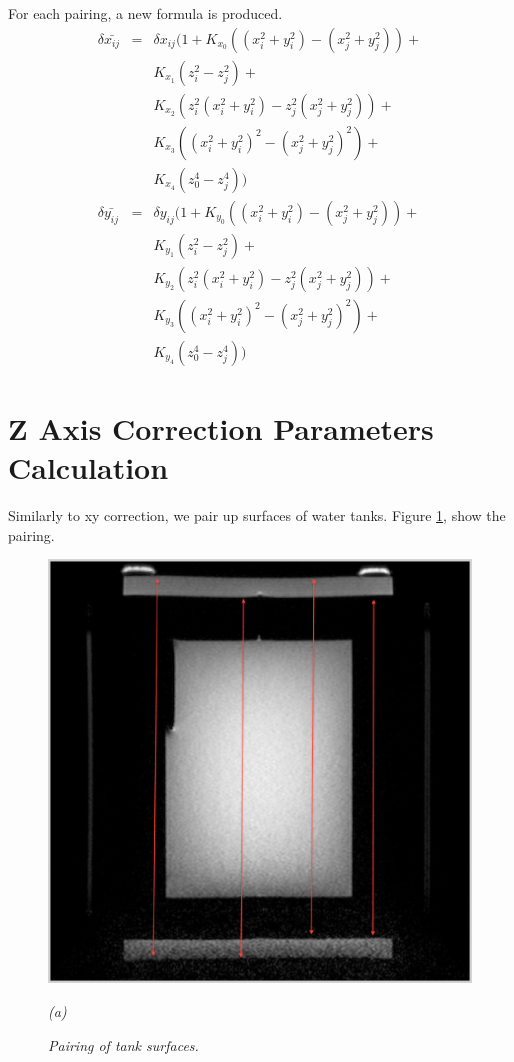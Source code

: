 For each pairing, a new formula is produced.
\begin{eqnarray} 
  \delta{\bar{x_{ij}}} & = & \delta{x_{ij}}(1 + K_{x_0}((x_i^2 + y_i^2) - (x_j^2 + y_j^2)) + \nonumber\\
  & & K_{x_1}(z_i^2 - z_j^2) + \nonumber\\
  & & K_{x_2}(z_i^2(x_i^2 + y_i^2)- z_j^2(x_j^2 + y_j^2)) + \nonumber\\
  & & K_{x_3}((x_i^2 + y_i^2)^2 - (x_j^2 + y_j^2)^2) + \nonumber\\
  & & K_{x_4}(z_0^4 - z_j^4)) \\
  \delta{\bar{y_{ij}}} & = & \delta{y_{ij}}(1 + K_{y_0}((x_i^2 + y_i^2) - (x_j^2 + y_j^2)) + \nonumber\\
  & & K_{y_1}(z_i^2 - z_j^2) + \nonumber\\
  & & K_{y_2}(z_i^2(x_i^2 + y_i^2)- z_j^2(x_j^2 + y_j^2)) + \nonumber\\
  & & K_{y_3}((x_i^2 + y_i^2)^2 - (x_j^2 + y_j^2)^2) + \nonumber\\
  & & K_{y_4}(z_0^4 - z_j^4))
\end{eqnarray}

\section{Z Axis Correction Parameters Calculation}

Similarly to xy correction, we pair up surfaces of water tanks. Figure \ref{fig:correction_surface_pairing}, 
show the pairing.

\begin{figure}[htb]
  \begin{minipage}[b]{0.8\linewidth}
    \centering
    \centerline{\mbox{\includegraphics[width=0.8\linewidth]{parameters/images/surface_pairing_z.eps}}}
    \centerline{\emph{(a)}}
  \end{minipage}
  \caption{\emph{Pairing of tank surfaces. }}
  \label{fig:correction_surface_pairing}
\end{figure}

